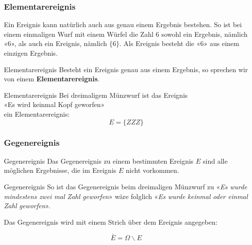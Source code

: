 \newpage
\subsubsection{Elementarereignis}
\begin{bemerkung}{}{}
  Ein Ereignis kann natürlich auch aus genau einem Ergebnis
  bestehen. So ist bei einem einmaligen Wurf mit einem Würfel die Zahl
  6 sowohl ein Ergebnis, nämlich «6», als auch ein Ereignis, nämlich
  $\{6\}$. Als Ereignis besteht die «6» aus einem einzigen Ergebnis.
  \end{bemerkung}

\begin{definition}{Elementarereignis}{}
Besteht ein Ereignis genau aus einem Ergebnis, so sprechen wir von einem \textbf{Elementarereignis}.
\end{definition}

\begin{beispiel}{Elementarereignis}{}
  Bei dreimaligem Münzwurf ist das Ereignis\\
  «Es wird keinmal Kopf geworfen»\\
  ein Elementarereignis:\\

  $$E = \{ZZZ\}$$
\end{beispiel}




\newpage
\subsubsection{Gegenereignis}
\begin{definition}{Gegenereignis}{}
  Das Gegenereignis zu einem bestimmten Ereignis $E$ sind alle möglichen Ergebnisse,
  die im Ereignis $E$ nicht vorkommen.
\end{definition}

\begin{beispiel}{Gegenereignis}{}
So ist das Gegenereignis beim dreimaligen Münzwurf zu «\textit{Es wurde mindestens zwei mal Zahl
geworfen}» wäre folglich «\textit{Es wurde keinmal oder einmal Zahl geworfen}».
\end{beispiel}

\vspace{2mm}


\begin{definition}{}{}
Das Gegenereignis wird mit einem Strich über dem Ereignis angegeben:

$$\bar{E} = \Omega \backslash E$$
\end{definition}

